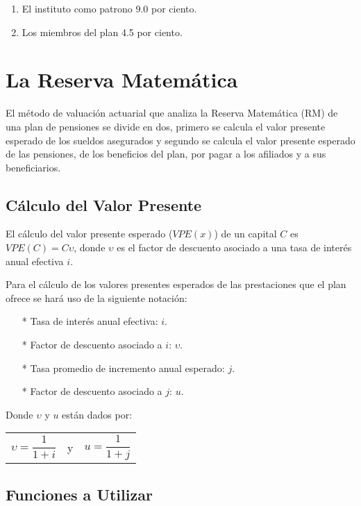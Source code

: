\documentclass[12pt,letterpaper,titlepage]{article}
\begin{document}
\begin{enumerate}
	\item El instituto como patrono 9.0 por ciento.
	\item Los miembros del plan 4.5 por ciento.
\end{enumerate}

\section{La Reserva Matemática}

El método de valuación actuarial que analiza la Reserva Matemática (RM) de una plan de pensiones se divide en dos, primero se calcula el valor presente esperado de los sueldos asegurados y segundo se calcula el valor presente esperado de las pensiones, de los beneficios del plan, por pagar a los afiliados y a sus beneficiarios.


\subsection{Cálculo del Valor Presente}

El cálculo del valor presente esperado ($VPE(x)$) de un capital $C$ es $VPE(C)=C\upsilon$, donde $\upsilon$ es el factor de descuento asociado a una tasa de interés anual efectiva $i$.

Para el cálculo de los valores presentes esperados de las prestaciones que el plan ofrece se hará uso de la siguiente notación:

\begin{itemize}
	\item [*] Tasa de interés anual efectiva: $i$.
	\item [*] Factor de descuento asociado a $i$: $\upsilon$.
	\item [*] Tasa promedio de incremento anual esperado: $j$.
	\item [*] Factor de descuento asociado a $j$: $\textit{u}$.
\end{itemize}

Donde $\upsilon$ y $\textit{u}$ están dados por:

\begin{center}
	\begin{tabular}{ccc}
$\upsilon = \dfrac{1}{1+i}$	& y & $\textit{u}=\dfrac{1}{1+j}$ \\ 
\end{tabular} 
\end{center}


\subsection{Funciones a Utilizar}
\end{document}
